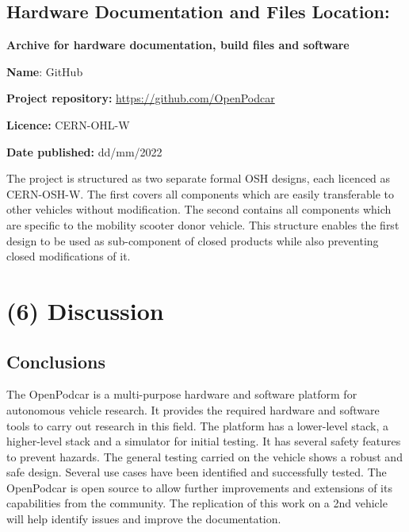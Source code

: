\documentclass[a4paper]{article}
\begin{document}
	\subsection{Hardware Documentation and Files Location:}\label{h.nbisrsde6sc3}
	
	\textbf{Archive for hardware documentation, build files and software}
	
	\textbf{Name}: GitHub
	
	
	\textbf{Project repository:} \url{https://github.com/OpenPodcar}
	
	\textbf{Licence:} CERN-OHL-W 
	
	\textbf{Date published:} dd/mm/2022
	
	The project is structured as two separate formal OSH designs, each licenced as CERN-OSH-W. The first covers all components which are easily transferable to other vehicles without modification. The second contains all components which are specific to the mobility scooter donor vehicle. This structure enables the first design to be used as sub-component of closed products while also preventing closed modifications of it.
	
	
	
	\section{(6) Discussion}\label{h.90jl7wm65t65}
	
	\subsection{Conclusions}\label{h.h3fr33ylzsnh}
	
	
	The OpenPodcar is a multi-purpose hardware and software platform for autonomous vehicle research. It provides the required hardware and software tools to carry out research in this field. The platform has a lower-level stack, a higher-level stack and a simulator for initial testing. It has several safety features to prevent hazards. The general testing carried on the vehicle shows a robust and safe design. Several use cases have been identified and successfully tested. The OpenPodcar is open source to allow further improvements and extensions of its capabilities from the community. The replication of this work on a 2nd vehicle will help identify issues and improve the documentation.
	
\end{document}
